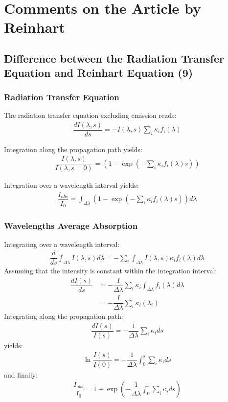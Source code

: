 \section{Comments on the Article by Reinhart}

\subsection{Difference between the Radiation Transfer Equation and Reinhart Equation (9)}

\subsubsection{Radiation Transfer Equation}
The radiation transfer equation excluding emission reads:
\begin{align}
	\label{eqn:120}
	\dfrac{d I(\lambda, s)}{ds} = - I(\lambda, s) \sum_i \kappa_i f_i(\lambda)
\end{align}

Integration along the propagation path yields:
\begin{align}
	\dfrac{I(\lambda,s)}{I(\lambda, s = 0)} = \left(1 - \exp\left(-\sum_i \kappa_i f_i(\lambda) s\right)\right)
\end{align}

Integration over a wavelength interval yields:
\begin{align}
	\label{eqn:122}
	\dfrac{I_{abs}}{I_0} = \int_{\Delta \lambda} \left(1 - \exp\left(-\sum_i \kappa_i f_i(\lambda) s\right)\right) d \lambda
\end{align}

\subsubsection{Wavelengths Average Absorption}

Integrating  over a wavelength interval:
\begin{align}
	\dfrac{d}{ds} \int_{\Delta \lambda} I(\lambda, s) d \lambda = - \sum_i  \int_{\Delta \lambda} I(\lambda, s) \kappa_i f_i(\lambda)  d \lambda
\end{align}
Assuming that the intensity is constant within the integration interval:
\begin{align}
    \dfrac{d I(s)}{ds} &= - \dfrac{I}{\Delta \lambda} \sum_i \kappa_i  \int_{\Delta \lambda}  f_i(\lambda)  d \lambda \\
                    &= - \dfrac{I}{\Delta \lambda} \sum_i \kappa_i(\lambda_i)
\end{align}
Integrating along the propagation path:
\begin{align}
	\dfrac{dI(s)}{I(s)} = - \dfrac{1}{\Delta \lambda} \sum_i \kappa_i ds
\end{align}
yields:
\begin{align}
	\ln \dfrac{I(s)}{I(0)} = - \dfrac{1}{\Delta \lambda} \int_{0}^{s} \sum_i \kappa_i ds
\end{align}
and finally:
\begin{align}
	\label{eqn:128}
	\dfrac{I_{abs}}{I_0} = 1 - \exp\left( - \dfrac{1}{\Delta \lambda} \int_{0}^{s} \sum_i \kappa_i ds \right)
\end{align}

